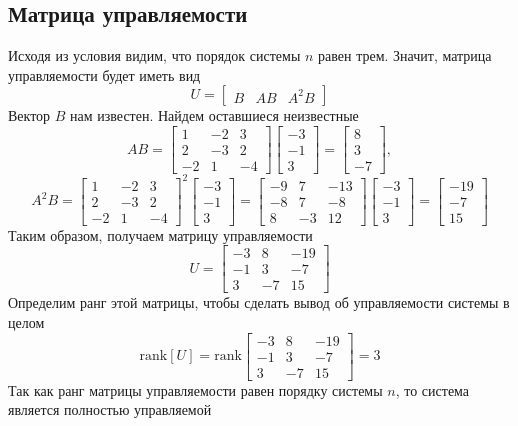\documentclass[a4paper, 12pt]{article}
\begin{document}
    \subsection{Матрица управляемости}
    Исходя из условия видим, что порядок системы $n$ равен трем. Значит, матрица управляемости будет иметь вид
    $$U=\begin{bmatrix}
        B &AB &A^2B
    \end{bmatrix}$$
    Вектор $B$ нам известен. Найдем оставшиеся неизвестные
    $$AB=\begin{bmatrix}
        1 &-2 &3\\
        2 &-3 &2\\
        -2 &1 &-4
    \end{bmatrix}\begin{bmatrix}
        -3\\
        -1\\
        3
    \end{bmatrix}=\begin{bmatrix}
        8\\
        3\\
        -7
    \end{bmatrix},$$
    $$A^2B=\begin{bmatrix}
        1 &-2 &3\\
        2 &-3 &2\\
        -2 &1 &-4
    \end{bmatrix}^2\begin{bmatrix}
        -3\\
        -1\\
        3
    \end{bmatrix}=\begin{bmatrix}
    -9	 &7	&-13\\
    -8	 &7	 &-8\\
    8	&-3	 &12
    \end{bmatrix}\begin{bmatrix}
        -3\\
        -1\\
        3
    \end{bmatrix}=\begin{bmatrix}  
    -19\\
    -7\\
    15
    \end{bmatrix}$$
    Таким образом, получаем матрицу управляемости
    $$
    U=\begin{bmatrix}
        -3 &8 &-19\\
        -1 &3 &-7\\
        3 &-7 &15
    \end{bmatrix}
    $$
    Определим ранг этой матрицы, чтобы сделать вывод об управляемости системы в целом
    $$
    \text{rank}\left[U\right]=\text{rank}\begin{bmatrix}
        -3 &8 &-19\\
        -1 &3 &-7\\
        3 &-7 &15
    \end{bmatrix}=3
    $$
    Так как ранг матрицы управляемости равен порядку системы $n$, то система является полностью управляемой
\end{document}

